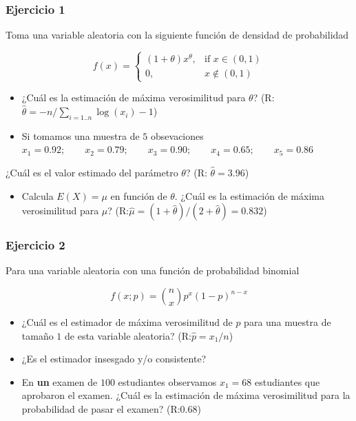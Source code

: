 \documentclass[
]{book}
\providecommand{\tightlist}{%
  \setlength{\itemsep}{0pt}\setlength{\parskip}{0pt}}
\begin{document}
\hypertarget{ejercicio-1-9}{%
\subsubsection{Ejercicio 1}\label{ejercicio-1-9}}

Toma una variable aleatoria con la siguiente función de densidad de probabilidad

\[
f(x)=
\begin{cases}
    (1+\theta)x^\theta,& \text{if } x\in (0,1)\\
    0,&  x\notin (0,1)
\end{cases}
\]

\begin{itemize}
\item
  ¿Cuál es la estimación de máxima verosimilitud para \(\theta\)? (R:\(\hat{\theta}=-n/\sum_{i=1..n} \log(x_i)-1\))
\item
  Si tomamos una muestra de \(5\) obsevaciones
  \(x_1 = 0.92; \qquad x_2 = 0.79; \qquad x_3 = 0.90; \qquad x_4 = 0.65; \qquad x_5 = 0.86\)
\end{itemize}

¿Cuál es el valor estimado del parámetro \(\theta\)? (R: \(\hat{\theta}=3.96\))

\begin{itemize}
\tightlist
\item
  Calcula \(E(X)=\mu\) en función de \(\theta\). ¿Cuál es la estimación de máxima verosimilitud para \(\mu\)? (R:\(\hat{\mu}=(1+\hat{\theta})/(2+\hat{\theta})=0.832\))
\end{itemize}

\hypertarget{ejercicio-2-9}{%
\subsubsection{Ejercicio 2}\label{ejercicio-2-9}}

Para una variable aleatoria con una función de probabilidad binomial

\[f(x; p)=\binom nxp^x(1-p)^{n-x}\]

\begin{itemize}
\item
  ¿Cuál es el estimador de máxima verosimilitud de \(p\) para una muestra de tamaño \(1\) de esta variable aleatoria? (R:\(\hat{p}=x_1/n\))
\item
  ¿Es el estimador insesgado y/o consistente?
\item
  En \textbf{un} examen de \(100\) estudiantes observamos \(x_1=68\) estudiantes que aprobaron el examen. ¿Cuál es la estimación de máxima verosimilitud para la probabilidad de pasar el examen? (R:0.68)
\end{itemize}
\end{document}
